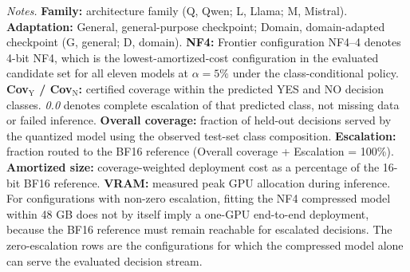 \documentclass[pdflatex,sn-mathphys-num]{sn-jnl}%
\theoremstyle{thmstyleone}%
\theoremstyle{thmstyletwo}%
\theoremstyle{thmstylethree}%
\begin{document}
\begin{table}[t]
\begin{minipage}{0.98\textwidth}
\textit{Notes.}
\textbf{Family:} architecture family (Q, Qwen; L, Llama; M, Mistral).
\textbf{Adaptation:} General, general-purpose checkpoint; Domain, domain-adapted checkpoint (G, general; D, domain).
\textbf{NF4:} Frontier configuration NF4--4 denotes 4-bit NF4, which is the
lowest-amortized-cost configuration in the evaluated candidate set for all
eleven models at $\alpha=5\%$ under the class-conditional policy.
\textbf{Cov$_{\mathrm{Y}}$ / Cov$_{\mathrm{N}}$:} certified coverage within
the predicted YES and NO decision classes.
\textit{0.0} denotes complete escalation of that predicted class, not missing
data or failed inference.
\textbf{Overall coverage:} fraction of held-out decisions served by the
quantized model using the observed test-set class composition.
\textbf{Escalation:} fraction routed to the BF16 reference
(Overall coverage + Escalation = 100\%).
\textbf{Amortized size:} coverage-weighted deployment cost as a percentage
of the 16-bit BF16 reference.
\textbf{VRAM:} measured peak GPU allocation during inference.
For configurations with non-zero escalation, fitting the NF4 compressed model
within 48 GB does not by itself imply a one-GPU end-to-end deployment, because
the BF16 reference must remain reachable for escalated decisions.
The zero-escalation rows are the configurations for which the compressed model
alone can serve the evaluated decision stream.
\end{minipage}
\end{table}
\end{document}

